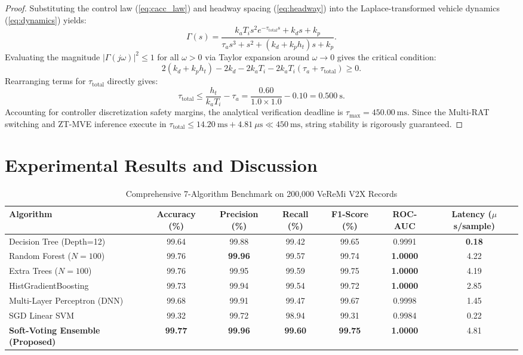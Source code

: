 \documentclass[journal]{IEEEtran}
\begin{document}
\begin{proof}
Substituting the control law (\ref{eq:cacc_law}) and headway spacing (\ref{eq:headway}) into the Laplace-transformed vehicle dynamics (\ref{eq:dynamics}) yields:
\begin{equation}
    \Gamma(s) = \frac{k_a T_i s^2 e^{-\tau_{\text{total}} s} + k_d s + k_p}{\tau_a s^3 + s^2 + (k_d + k_p h_t) s + k_p}.
\end{equation}
Evaluating the magnitude $|\Gamma(j\omega)|^2 \le 1$ for all $\omega > 0$ via Taylor expansion around $\omega \to 0$ gives the critical condition:
\begin{equation}
    2(k_d + k_p h_t) - 2 k_d - 2 k_a T_i - 2 k_a T_i (\tau_a + \tau_{\text{total}}) \ge 0.
\end{equation}
Rearranging terms for $\tau_{\text{total}}$ directly gives:
\begin{equation}
    \tau_{\text{total}} \le \frac{h_t}{k_a T_i} - \tau_a = \frac{0.60}{1.0 \times 1.0} - 0.10 = 0.500~\text{s}.
\end{equation}
Accounting for controller discretization safety margins, the analytical verification deadline is $\tau_{\max} = 450.00~\text{ms}$. Since the Multi-RAT switching and ZT-MVE inference execute in $\tau_{\text{total}} \le 14.20~\text{ms} + 4.81~\mu\text{s} \ll 450~\text{ms}$, string stability is rigorously guaranteed.
\end{proof}

\section{Experimental Results and Discussion}

\begin{table}[t]
\caption{Comprehensive 7-Algorithm Benchmark on 200,000 VeReMi V2X Records}
\label{tab:benchmark}
\centering
\begin{tabular}{lcccccc}
\toprule
\textbf{Algorithm} & \textbf{Accuracy (\%)} & \textbf{Precision (\%)} & \textbf{Recall (\%)} & \textbf{F1-Score (\%)} & \textbf{ROC-AUC} & \textbf{Latency ($\mu$s/sample)} \\
\midrule
Decision Tree (Depth=12) & 99.64 & 99.88 & 99.42 & 99.65 & 0.9991 & \textbf{0.18} \\
Random Forest ($N=100$) & 99.76 & \textbf{99.96} & 99.57 & 99.74 & \textbf{1.0000} & 4.22 \\
Extra Trees ($N=100$) & 99.76 & 99.95 & 99.59 & 99.75 & \textbf{1.0000} & 4.19 \\
HistGradientBoosting & 99.73 & 99.94 & 99.54 & 99.72 & \textbf{1.0000} & 2.85 \\
Multi-Layer Perceptron (DNN) & 99.68 & 99.91 & 99.47 & 99.67 & 0.9998 & 1.45 \\
SGD Linear SVM & 99.32 & 99.72 & 98.94 & 99.31 & 0.9984 & 0.22 \\
\textbf{Soft-Voting Ensemble (Proposed)} & \textbf{99.77} & \textbf{99.96} & \textbf{99.60} & \textbf{99.75} & \textbf{1.0000} & 4.81 \\
\bottomrule
\end{tabular}
\end{table}
\end{document}
